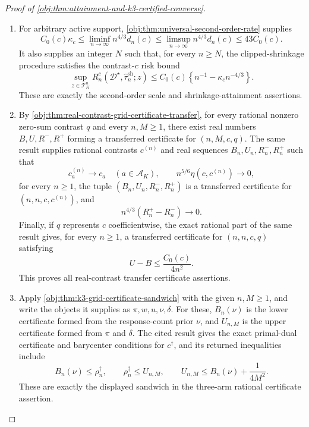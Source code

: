 \documentclass[11pt]{article}
\begin{document}
\begin{proof}[Proof of \cref{obj:thm:attainment-and-k3-certified-converse}]
\begin{enumerate}
\item For arbitrary active support, \cref{obj:thm:universal-second-order-rate} supplies
\[
C_0(c)\kappa_c
\le
\liminf_{n\to\infty} n^{4/3}d_n(c)
\le
\limsup_{n\to\infty} n^{4/3}d_n(c)
\le
43C_0(c).
\]
It also supplies an integer \(N\) such that, for every \(n\ge N\), the clipped-shrinkage procedure satisfies the contrast-\(c\) risk bound
\[
\sup_{z\in\mathcal T_K^n}
R_n^c(\mathcal D^\star,\widehat\tau_n^{\mathrm{sh}};z)
\le
C_0(c)\left\{n^{-1}-\kappa_c n^{-4/3}\right\}.
\]
These are exactly the second-order scale and shrinkage-attainment assertions.

\item By \cref{obj:thm:real-contrast-grid-certificate-transfer}, for every rational nonzero zero-sum contrast \(q\) and every \(n,M\ge 1\), there exist real numbers \(B,U,R^-,R^+\) forming a transferred certificate for \((n,M,c,q)\). The same result supplies rational contrasts \(c^{(n)}\) and real sequences \(B_n,U_n,R_n^-,R_n^+\) such that
\[
c^{(n)}_a\to c_a\quad(a\in\mathcal A_K),
\qquad
n^{5/6}\eta(c,c^{(n)})\to 0,
\]
for every \(n\ge 1\), the tuple \((B_n,U_n,R_n^-,R_n^+)\) is a transferred certificate for \((n,n,c,c^{(n)})\), and
\[
n^{4/3}(R_n^+-R_n^-)\to 0.
\]
Finally, if \(q\) represents \(c\) coefficientwise, the exact rational part of the same result gives, for every \(n\ge 1\), a transferred certificate for \((n,n,c,q)\) satisfying
\[
U-B\le \frac{C_0(c)}{4n^2}.
\]
This proves all real-contrast transfer certificate assertions.

\item Apply \cref{obj:thm:k3-grid-certificate-sandwich} with the given \(n,M\ge 1\), and write the objects it supplies as \(\pi,w,u,\nu,\delta\). For these, \(B_n(\nu)\) is the lower certificate formed from the response-count prior \(\nu\), and \(U_{n,M}\) is the upper certificate formed from \(\pi\) and \(\delta\). The cited result gives the exact primal-dual certificate and barycenter conditions for \(c^\dagger\), and its returned inequalities include
\[
B_n(\nu)\le \rho_n^\dagger,
\qquad
\rho_n^\dagger\le U_{n,M},
\qquad
U_{n,M}\le B_n(\nu)+\frac{1}{4M^2}.
\]
These are exactly the displayed sandwich in the three-arm rational certificate assertion.
\end{enumerate}
\end{proof}




\end{document}

